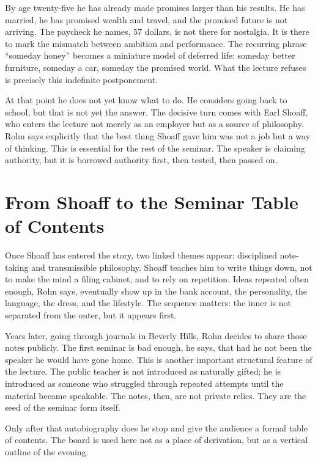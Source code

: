 By age twenty-five he has already made promises larger than his results. He has married, he has promised wealth and travel, and the promised future is not arriving. The paycheck he names, \(57\) dollars, is not there for nostalgia. It is there to mark the mismatch between ambition and performance. The recurring phrase ``someday honey'' becomes a miniature model of deferred life: someday better furniture, someday a car, someday the promised world. What the lecture refuses is precisely this indefinite postponement.

At that point he does not yet know what to do. He considers going back to school, but that is not yet the answer. The decisive turn comes with Earl Shoaff, who enters the lecture not merely as an employer but as a source of philosophy. Rohn says explicitly that the best thing Shoaff gave him was not a job but a way of thinking. This is essential for the rest of the seminar. The speaker is claiming authority, but it is borrowed authority first, then tested, then passed on.

\section{From Shoaff to the Seminar Table of Contents}

Once Shoaff has entered the story, two linked themes appear: disciplined note-taking and transmissible philosophy. Shoaff teaches him to write things down, not to make the mind a filing cabinet, and to rely on repetition. Ideas repeated often enough, Rohn says, eventually show up in the bank account, the personality, the language, the dress, and the lifestyle. The sequence matters: the inner is not separated from the outer, but it appears first.

Years later, going through journals in Beverly Hills, Rohn decides to share those notes publicly. The first seminar is bad enough, he says, that had he not been the speaker he would have gone home. This is another important structural feature of the lecture. The public teacher is not introduced as naturally gifted; he is introduced as someone who struggled through repeated attempts until the material became speakable. The notes, then, are not private relics. They are the seed of the seminar form itself.

Only after that autobiography does he stop and give the audience a formal table of contents. The board is used here not as a place of derivation, but as a vertical outline of the evening.

